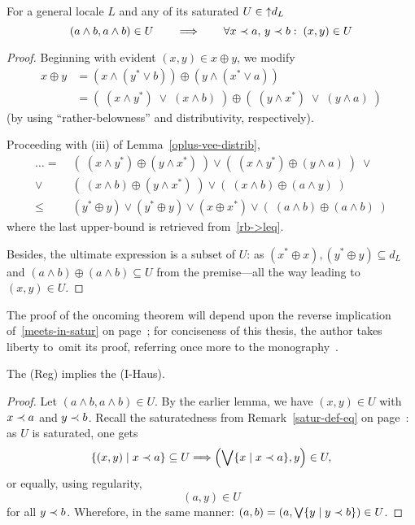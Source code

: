 \begin{lem}
  For a general locale $L$ and any of its saturated $U\in \left\uparrow
  d_L\right.$
  \[
    (a \wedge b, a \wedge b) \in U \qquad \Longrightarrow \qquad \forall x \prec
    a, \, y \prec b: \; (x, y) \in U
  \]
\end{lem}
\begin{proof}
  Beginning with evident $(x, y)\in x \oplus y$, we modify
  \begin{align*}
    x \oplus y &= (x \wedge (y^* \vee b)) \oplus (y \wedge (x^* \vee a)) \\
               &= (\; (x \wedge y^*) \; \vee \; (x \wedge b) \; ) \oplus (\; (y
    \wedge x^*) \; \vee \; (y \wedge a) \; )
  \end{align*}
  (by using ``rather-belowness'' and distributivity, respectively).

  Proceeding with (iii) of Lemma~\ref{oplus-vee-distrib}\thinspace,
  \begin{align*}
     \ldots = \; &(\; (x \wedge y^*) \oplus (y \wedge x^*) \; ) \vee 
            (\; (x \wedge y^*) \oplus (y \wedge a) \; ) \; \vee \\
            \vee \; &(\; (x \wedge b) \oplus (y \wedge x^*) \; ) \vee
            (\; (x \wedge b) \oplus (a \wedge y) \; ) \\
     \leq \; &(y^*\oplus y) \vee (y^*\oplus y) \vee (x\oplus x^*) \vee
                  (\; (a \wedge b)\oplus(a \wedge b) \;)
  \end{align*}
  where the last upper-bound is retrieved from~\ref{rb->leq}\thinspace.

  Besides, the ultimate expression is a subset of $U$:
  as $(x^*\oplus x), (y^*\oplus y)\subseteq d_L$ and $(a \wedge b)\oplus(a
  \wedge b)\subseteq U$ from the premise---all the way leading to $(x, y)\in
  U$.
\end{proof}

The proof of the oncoming theorem will depend upon the reverse implication
of~\ref{meets-in-satur} on page~\pageref{meets-in-satur}\thinspace;
for conciseness of this thesis, the author takes liberty to~omit its proof,
referring once more to the monography~\cite{picado-pultr12}.

\begin{thm}
  The (Reg) implies the (I-Haus).
\end{thm}
\begin{proof}
  Let $(a \wedge b, a \wedge b) \in U$.
  By the earlier lemma, we have $(x, y)\in U$ with $x \prec a$ and $y \prec b$.
  Recall the saturatedness from Remark~\ref{satur-def-eq} on
  page~\pageref{satur-def-eq}\thinspace:
  as $U$ is saturated, one gets
  \[
    \left\{ (x, y) \mid x \prec a \right\} \subseteq U
    \Longrightarrow
    \left(\bigvee \{x \mid x \prec a\}, y\right)\in U,
  \]
  or equally, using regularity,
  \[
    \left(a, y\right)\in U
  \]
  for all $y \prec b$.
  Wherefore, in the same manner: $(a, b) = \left(a, \bigvee \{y \mid y \prec
  b\}\right)\in U$.
\end{proof}
